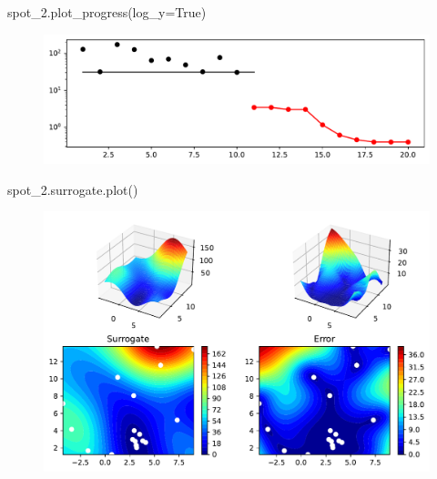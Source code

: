 \documentclass[
  letterpaper,
  DIV=11,
  numbers=noendperiod]{scrreprt}
\newenvironment{Shaded}{\begin{snugshade}}{\end{snugshade}}
\newcommand{\NormalTok}[1]{\textcolor[rgb]{0.00,0.23,0.31}{#1}}
\newcommand{\OperatorTok}[1]{\textcolor[rgb]{0.37,0.37,0.37}{#1}}
\newcommand{\VariableTok}[1]{\textcolor[rgb]{0.07,0.07,0.07}{#1}}
\begin{document}
\begin{Shaded}
\begin{Highlighting}[]
\NormalTok{spot\_2.plot\_progress(log\_y}\OperatorTok{=}\VariableTok{True}\NormalTok{)}
\end{Highlighting}
\end{Shaded}

\begin{figure}[H]

{\centering \includegraphics{010_num_spot_sklearn_surrogate_files/figure-pdf/cell-9-output-1.pdf}

}

\end{figure}

\begin{Shaded}
\begin{Highlighting}[]
\NormalTok{spot\_2.surrogate.plot()}
\end{Highlighting}
\end{Shaded}

\begin{figure}[H]

{\centering \includegraphics{010_num_spot_sklearn_surrogate_files/figure-pdf/cell-10-output-1.pdf}

}

\end{figure}
\end{document}
